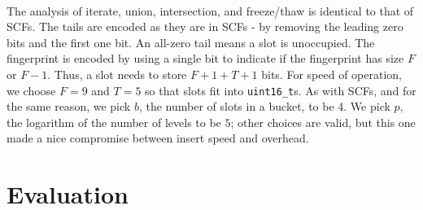\documentclass[letterpaper,twocolumn,10pt]{article}
\newcommand{\taffy}{stretchy}
\newcommand{\TCF}{SCF}
\newcommand{\MTCF}{MSCF}
\newcommand{\taffy}{taffy}
\newcommand{\TCF}{TCF}
\newcommand{\MTCF}{MTCF}
\begin{document}

\paragraph{}
The analysis of iterate, union, intersection, and freeze/thaw is identical to that of \TCF{}s.
The tails are encoded as they are in \TCF{}s - by removing the leading zero bits and the first one bit.
An all-zero tail means a slot is unoccupied.
The fingerprint is encoded by using a single bit to indicate if the fingerprint has size $F$ or $F-1$.
Thus, a slot needs to store $F + 1 + T + 1$ bits.
For speed of operation, we choose $F = 9$ and $T = 5$ so that slots fit into {\tt uint16\_t}s.
As with \TCF{}s, and for the same reason, we pick $b$, the number of slots in a bucket, to be 4.
We pick $p$, the logarithm of the number of levels to be $5$; other choices are valid, but this one made a nice compromise between insert speed and overhead.



\section{Evaluation}
\label{eval}

\end{document}
